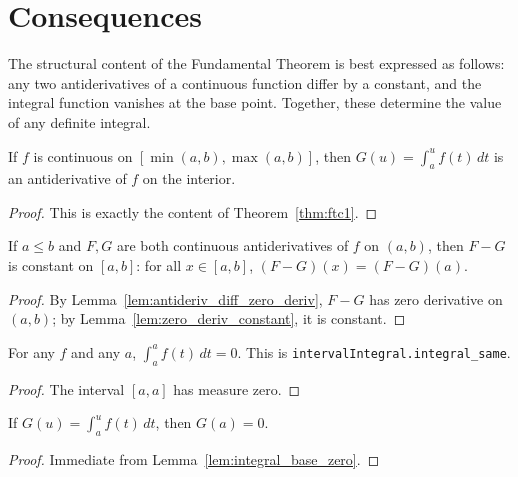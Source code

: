 \section{Consequences}

The structural content of the Fundamental Theorem is best expressed as follows: any two antiderivatives of a continuous function differ by a constant, and the integral function vanishes at the base point. Together, these determine the value of any definite integral.

\begin{lemma}
    \label{lem:integral_is_antiderivative}

    If $f$ is continuous on $[\min(a,b), \max(a,b)]$, then $G(u) = \int_a^u f(t)\,dt$ is an antiderivative of $f$ on the interior.
\end{lemma}
\begin{proof}
    This is exactly the content of Theorem~\ref{thm:ftc1}.
\end{proof}

\begin{lemma}
    \label{lem:antiderivatives_diff_constant}

    If $a \le b$ and $F, G$ are both continuous antiderivatives of $f$ on $(a,b)$, then $F - G$ is constant on $[a,b]$: for all $x \in [a,b]$, $(F - G)(x) = (F - G)(a)$.
\end{lemma}
\begin{proof}
    By Lemma~\ref{lem:antideriv_diff_zero_deriv}, $F - G$ has zero derivative on $(a,b)$; by Lemma~\ref{lem:zero_deriv_constant}, it is constant.
\end{proof}

\begin{lemma}
    \label{lem:integral_base_zero}

    For any $f$ and any $a$, $\int_a^a f(t)\,dt = 0$. This is \texttt{intervalIntegral.integral\_same}.
\end{lemma}
\begin{proof}
    The interval $[a,a]$ has measure zero.
\end{proof}

\begin{lemma}
    \label{lem:integral_func_at_base}

    If $G(u) = \int_a^u f(t)\,dt$, then $G(a) = 0$.
\end{lemma}
\begin{proof}
    Immediate from Lemma~\ref{lem:integral_base_zero}.
\end{proof}

